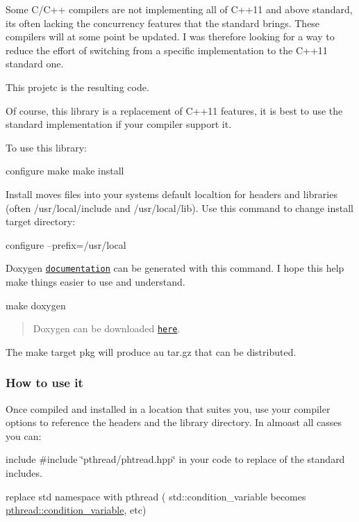Some C/\+C++ compilers are not implementing all of C++11 and above standard, it\textquotesingle{}s often lacking the concurrency features that the standard brings. These compilers will at some point be updated. I was therefore looking for a way to reduce the effort of switching from a specific implementation to the C++11 standard one.

This projetc is the resulting code.

Of course, this library is a replacement of C++11 features, it is best to use the standard implementation if your compiler support it.

To use this library\+: \begin{DoxyVerb}configure
make
make install
\end{DoxyVerb}


Install moves files into your system\textquotesingle{}s default localtion for headers and libraries (often /usr/local/include and /usr/local/lib). Use this command to change install target directory\+: \begin{DoxyVerb}configure --prefix=/usr/local
\end{DoxyVerb}


Doxygen \href{http://herbertkoelman.github.io/cpp-pthread/doc/html/}{\tt documentation} can be generated with this command. I hope this help make things easier to use and understand. \begin{DoxyVerb}make doxygen
\end{DoxyVerb}


\begin{quote}
Doxygen can be downloaded \href{http://www.stack.nl/~dimitri/doxygen/index.html}{\tt here}. \end{quote}


The {\ttfamily make} target {\ttfamily pkg} will produce au tar.\+gz that can be distributed.

\subsubsection*{How to use it}

Once compiled and installed in a location that suites you, use your compiler options to reference the headers and the library directory. In almoast all casses you can\+:
\begin{DoxyItemize}
\item include {\ttfamily \#include \char`\"{}pthread/phtread.\+hpp\char`\"{}} in your code to replace of the standard includes.
\item replace {\ttfamily std} namespace with {\ttfamily pthread} ( std\+::condition\+\_\+variable becomes \hyperlink{classpthread_1_1condition__variable}{pthread\+::condition\+\_\+variable}, etc)
\end{DoxyItemize}

